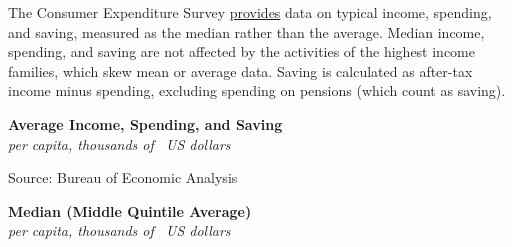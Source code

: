 \documentclass{report}
\makeatletter
\newcommand{\tbllink}[1]{\href{https://raw.githubusercontent.com/bdecon/US-chartbook/master/chartbook/data/#1}{\faTable}}
\newcommand*\short[1]{\expandafter\@gobbletwo\number\numexpr#1\relax}
\newcommand{\absnode}[3]{\node[below right, align=left] at (axis cs: #1,#2) {#3};}
\newcommand{\shdateaxisticks}{
		date coordinates in=x, axis line style={draw=none},
		xmax={2022-03-15},
		max space between ticks=40,	    
		xtick={{1990-01-01}, {1995-01-01}, {2000-01-01}, 
			{2005-01-01}, {2010-01-01}, {2015-01-01}, {2020-01-01}},
		minor xtick={},
		enlarge y limits={0.06}, enlarge x limits={0.01},
		}
\newcommand{\bbar}[2]{extra #1 ticks = {{#2}}, extra #1 tick labels = ,
		extra #1 tick style = {grid=major, grid style={thick, black!25}},}
\newcommand{\stdline}[4]{\addplot[very thick, no markers, color=#1] 
		table [x=#2, y=#3, col sep=comma] {#4};	}
\newcommand{\rbars}{
		\fill[color=black!10] (axis cs:{1990-07-01},\pgfkeysvalueof{/pgfplots/ymin}) rectangle 
			(axis cs:{1991-03-01}, \pgfkeysvalueof{/pgfplots/ymax});
		\fill[color=black!10] (axis cs:{2007-12-01},\pgfkeysvalueof{/pgfplots/ymin}) rectangle 
			(axis cs:{2009-07-01}, \pgfkeysvalueof{/pgfplots/ymax});
		\fill[color=black!10] (axis cs:{2001-03-01},\pgfkeysvalueof{/pgfplots/ymin}) rectangle 
			(axis cs:{2001-11-01}, \pgfkeysvalueof{/pgfplots/ymax});
		\fill[color=black!10] (axis cs:{2020-02-01},\pgfkeysvalueof{/pgfplots/ymin}) rectangle 
			(axis cs:{2020-05-01}, \pgfkeysvalueof{/pgfplots/ymax});}
\makeatother
\begin{document}
{\begin{minipage}{0.76\textwidth}


The Consumer Expenditure Survey \href{https://www.bls.gov/cex/tables.htm}{provides} data on typical income, spending, and saving, measured as the median rather than the average. Median income, spending, and saving are not affected by the activities of the highest income families, which skew mean or average data. Saving is calculated as after-tax income minus spending, excluding spending on pensions (which count as saving). 
\end{minipage}
\vspace{2mm}

\begin{minipage}{0.43\textwidth}
\normalsize \textbf{Average Income, Spending, and Saving}\\
\footnotesize{\textit{per capita, thousands of \unskip \ US dollars}}
\vspace{4.8cm}

\hspace{4mm} 

\footnotesize{Source: Bureau of Economic Analysis} \hfill \tbllink{inc_out_save.csv}
\end{minipage} \hspace{8mm}
\begin{minipage}{0.43\textwidth}
\normalsize \textbf{Median (Middle Quintile Average)}\\
\footnotesize{\textit{per capita, thousands of \unskip \ US dollars}}
\vspace{4.8cm}


\end{minipage}}
\end{document}
